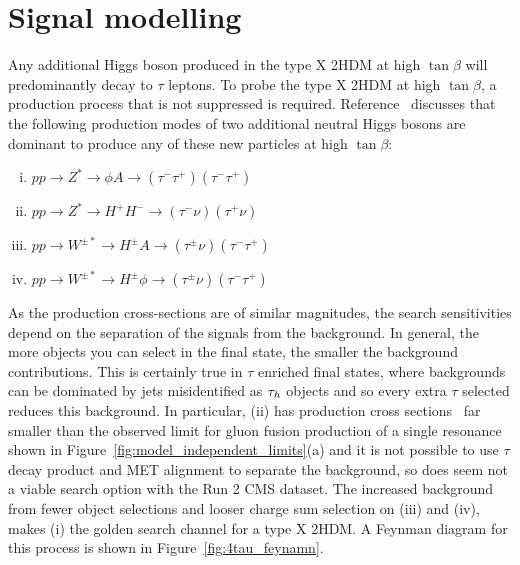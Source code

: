 \section{Signal modelling}
\label{sec:4tau_signal_modelling}

Any additional Higgs boson produced in the type X \ac{2HDM} at high $\tan\beta$ will predominantly decay to $\tau$ leptons.
To probe the type X \ac{2HDM} at high $\tan\beta$, a production process that is not suppressed is required.
Reference~\cite{Jueid:2021avn} discusses that the following production modes of two additional neutral Higgs bosons are dominant to produce any of these new particles at high $\tan\beta$:
\begin{enumerate}[i)]
  \item $pp \rightarrow Z^{*} \rightarrow \phi A \rightarrow (\tau^{-}\tau^{+})(\tau^{-}\tau^{+})$
  \item $pp \rightarrow Z^{*} \rightarrow H^{+}H^{-} \rightarrow (\tau^{-}\nu)(\tau^{+}\nu)$
  \item $pp \rightarrow W^{\pm *} \rightarrow H^{\pm}A \rightarrow (\tau^{\pm}\nu)(\tau^{-}\tau^{+})$
  \item $pp \rightarrow W^{\pm *} \rightarrow H^{\pm}\phi \rightarrow (\tau^{\pm}\nu)(\tau^{-}\tau^{+})$
\end{enumerate}
As the production cross-sections are of similar magnitudes, the search sensitivities depend on the separation of the signals from the background.
In general, the more objects you can select in the final state, the smaller the background contributions.
This is certainly true in $\tau$ enriched final states, where backgrounds can be dominated by jets misidentified as $\tau_{h}$ objects and so every extra $\tau$ selected reduces this background.
In particular, (ii) has production cross sections~\cite{Jueid:2021avn} far smaller than the observed limit for gluon fusion production of a single resonance shown in Figure~\ref{fig:model_independent_limits}(a) and it is not possible to use $\tau$ decay product and \ac{MET} alignment to separate the background, so does seem not a viable search option with the Run 2 \ac{CMS} dataset.
The increased background from fewer object selections and looser charge sum selection on (iii) and (iv), makes (i) the golden search channel for a type X \ac{2HDM}. 
A Feynman diagram for this process is shown in Figure~\ref{fig:4tau_feynamn}. \\

